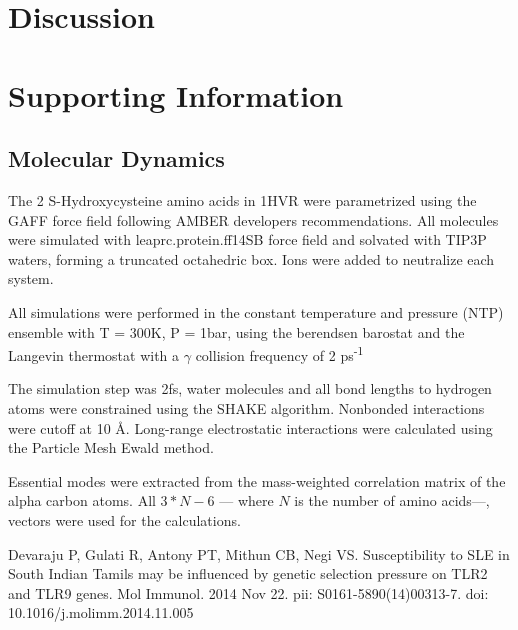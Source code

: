 \documentclass[10pt,letterpaper]{article}
\begin{document}
\FloatBarrier
\newpage


\section{Discussion}

\newpage
\section{Supporting Information}
\subsection{Molecular Dynamics}
\label{Molecular Dynamics}
The 2 S-Hydroxycysteine amino acids in 1HVR were parametrized using the GAFF force field following AMBER developers recommendations. All molecules were simulated with leaprc.protein.ff14SB force field and solvated with TIP3P waters, forming a truncated octahedric box. Ions were added to neutralize each system.

All simulations were performed in the constant temperature and pressure (NTP) ensemble with T = 300K, P = 1bar, using the berendsen barostat and the Langevin thermostat with a \textbf{$\gamma$} collision frequency of 2 ps\textsuperscript{-1}

The simulation step was 2fs, water molecules and all bond lengths to hydrogen atoms were constrained using the SHAKE algorithm. Nonbonded interactions were cutoff at 10 \AA . Long-range electrostatic interactions were calculated using the Particle Mesh Ewald method.

Essential modes were extracted from the mass-weighted correlation matrix of the alpha carbon atoms. All \( {3*N-6} \) --- where \(N\) is the number of amino acids---, vectors were used for the calculations. 

%
%
% 
\newpage
\nolinenumbers
\begin{thebibliography}{10}

Devaraju P, Gulati R, Antony PT, Mithun CB, Negi VS. Susceptibility to SLE in South Indian Tamils may be influenced by genetic selection pressure on TLR2 and TLR9 genes. Mol Immunol. 2014 Nov 22. pii: S0161-5890(14)00313-7. doi: 10.1016/j.molimm.2014.11.005

\end{thebibliography}
\end{document}
